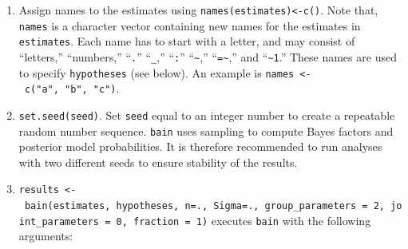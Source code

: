 \documentclass[
]{book}
\providecommand{\tightlist}{%
  \setlength{\itemsep}{0pt}\setlength{\parskip}{0pt}}
\begin{document}
\begin{enumerate}
\def\labelenumi{\arabic{enumi})}
\setcounter{enumi}{1}
\tightlist
\item
  Assign names to the estimates
  using \texttt{names(estimates)\textless{}-c()}. Note that, \texttt{names} is a
  character vector containing new names for the estimates in \texttt{estimates}.
  Each name has to start with a letter, and may consist of ``letters,''
  ``numbers,'' ``\texttt{.}'' ``\texttt{\_},'' ``\texttt{:}'' ``\texttt{\textasciitilde{}},'' ``\texttt{=\textasciitilde{}},'' and ``\texttt{\textasciitilde{}1}.''
  These names are
  used to specify \texttt{hypotheses}
  (see below). An example is \texttt{names\ \textless{}-\ c("a",\ "b",\ "c")}.
\item
  \texttt{set.seed(seed)}. Set \texttt{seed} equal to an integer
  number to create a repeatable random number sequence. \texttt{bain} uses sampling to compute Bayes factors and posterior model probabilities. It is therefore recommended to run analyses with two different seeds to ensure stability of the results.
\item
  \texttt{results\ \textless{}-\ bain(estimates,\ hypotheses,\ n=.,\ Sigma=.,\ group\_parameters\ =\ 2,\ joint\_parameters\ =\ 0,\ fraction\ =\ 1)}
  executes \texttt{bain} with the
  following arguments:
\end{enumerate}
\end{document}
